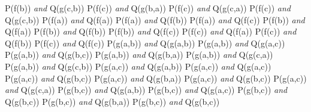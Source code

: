 \documentclass[12pt,a4paper,spanish]{article}
\begin{document}
\begin{enumerate}
   P(f(b)) \emph{and} Q(g(c,b))
   \newline
   P(f(c)) \emph{and} Q(g(b,a))
   \newline
   P(f(c)) \emph{and} Q(g(c,a))
   \newline
   P(f(c)) \emph{and} Q(g(c,b))
   \newline
   \newline
   P(f(a)) \emph{and} Q(f(a))
   \newline
   P(f(a)) \emph{and} Q(f(b))
   \newline
   P(f(a)) \emph{and} Q(f(c))
   \newline
   P(f(b)) \emph{and} Q(f(a))
   \newline
   P(f(b)) \emph{and} Q(f(b))
   \newline
   P(f(b)) \emph{and} Q(f(c))
   \newline
   P(f(c)) \emph{and} Q(f(a))
   \newline
   P(f(c)) \emph{and} Q(f(b))
   \newline
   P(f(c)) \emph{and} Q(f(c))
   \newline
   \newline
   P(g(a,b)) \emph{and} Q(g(a,b))
   \newline
   P(g(a,b)) \emph{and} Q(g(a,c))
   \newline
   P(g(a,b)) \emph{and} Q(g(b,c))
   \newline
   P(g(a,b)) \emph{and} Q(g(b,a))
   \newline
   P(g(a,b)) \emph{and} Q(g(c,a))
   \newline
   P(g(a,b)) \emph{and} Q(g(c,b))
   \newline
   P(g(a,c)) \emph{and} Q(g(a,b))
   \newline
   P(g(a,c)) \emph{and} Q(g(a,c))
   \newline
   P(g(a,c)) \emph{and} Q(g(b,c))
   \newline
   P(g(a,c)) \emph{and} Q(g(b,a))
   \newline
   P(g(a,c)) \emph{and} Q(g(b,c))
   \newline
   P(g(a,c)) \emph{and} Q(g(c,a))
   \newline
   P(g(b,c)) \emph{and} Q(g(a,b))
   \newline
   P(g(b,c)) \emph{and} Q(g(a,c))
   \newline
   P(g(b,c)) \emph{and} Q(g(b,c))
   \newline
   P(g(b,c)) \emph{and} Q(g(b,a))
   \newline
   P(g(b,c)) \emph{and} Q(g(b,c))
   \newline

\end{enumerate}
\end{document}
